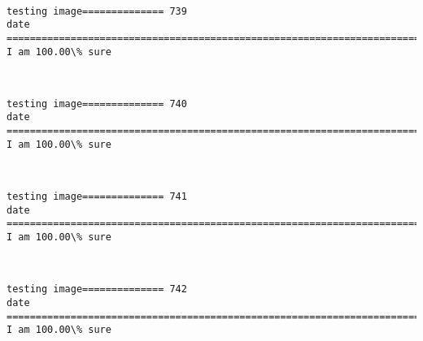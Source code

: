 \documentclass[11pt]{article}
\begin{document}
    \begin{center}
    \end{center}
    { \hspace*{\fill} \\}
    
    \begin{Verbatim}[commandchars=\\\{\}]
testing image============== 739
date
============================================================================
I am 100.00\% sure

    \end{Verbatim}

    \begin{center}
    \end{center}
    { \hspace*{\fill} \\}
    
    \begin{Verbatim}[commandchars=\\\{\}]
testing image============== 740
date
============================================================================
I am 100.00\% sure

    \end{Verbatim}

    \begin{center}
    \end{center}
    { \hspace*{\fill} \\}
    
    \begin{Verbatim}[commandchars=\\\{\}]
testing image============== 741
date
============================================================================
I am 100.00\% sure

    \end{Verbatim}

    \begin{center}
    \end{center}
    { \hspace*{\fill} \\}
    
    \begin{Verbatim}[commandchars=\\\{\}]
testing image============== 742
date
============================================================================
I am 100.00\% sure

    \end{Verbatim}
\end{document}

